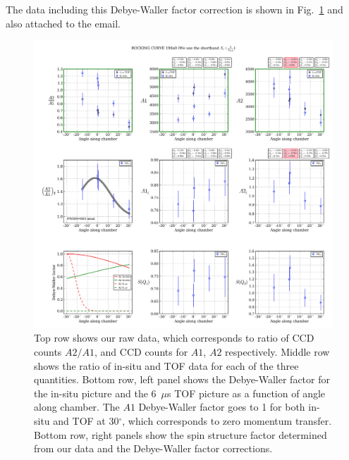 \documentclass[11pt,letter]{article}
\begin{document}
The data including this Debye-Waller factor correction is shown in Fig.~\ref{fig:data} and also attached to the email.
\begin{figure}
\centering \includegraphics[width=\textwidth]{figures/rocking.png}
\caption[Rocking at 190$a_{0}$]{\small Top row shows our raw data, which corresponds to ratio of CCD counts $A2/A1$, and CCD counts for $A1$, $A2$ respectively.  Middle row shows the ratio of in-situ and TOF data for each of the three quantities.  Bottom row, left panel shows the Debye-Waller factor for the in-situ picture and the 6~$\mu$s TOF picture as a function of angle along chamber.  The $A1$ Debye-Waller factor goes to 1 for both in-situ and TOF at 30$^{\circ}$, which corresponds to zero momentum transfer.  Bottom row, right panels show the spin structure factor determined from our data and the Debye-Waller factor corrections. }
\label{fig:data}
\end{figure}


 

%
%
\end{document}
